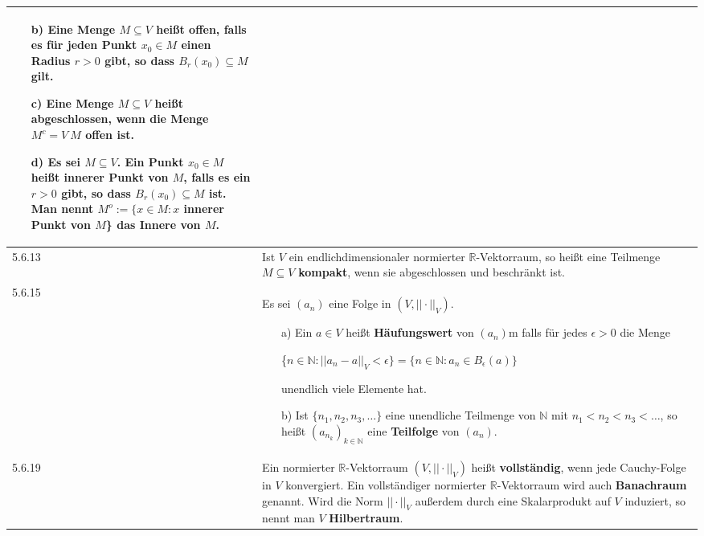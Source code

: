 \begin{table}[H]
\begin{tabularx}{\textwidth}{X m{16cm}}
\begin{itemize}
                \item[b)] Eine Menge $M \subseteq V$ heißt \textbf{offen}, falls es für jeden Punkt $x_0 \in M$ einen Radius
                            $r > 0$ gibt, so dass $B_r(x_0) \subseteq M$ gilt.
                \item[c)] Eine Menge $M \subseteq V$ heißt \textbf{abgeschlossen}, wenn die Menge $M^c = V \ M$ offen ist.
                \item[d)] Es sei $M \subseteq V$. Ein Punkt $x_0 \in M$ heißt \textbf{innerer Punkt} von $M$, falls es ein
                            $r > 0$ gibt, so dass $B_r(x_0) \subseteq M$ ist. \hfill \break 
                            Man nennt $M^o := \{x \in M: x$ innerer Punkt von $M$\} das \textbf{Innere von $M$}.    
                              
            \end{itemize} \\
    \midrule
    5.6.13& Ist $V$ ein endlichdimensionaler normierter $\mathbb{R}$-Vektorraum, so hei\ss t eine Teilmenge $M \subseteq V$
            \textbf{kompakt}, wenn sie abgeschlossen und beschränkt ist. \\
    \midrule
    5.6.15& Es sei $(a_n)$ eine Folge in $(V, ||\cdot||_V)$.
            \begin{itemize}
                \item[a)] Ein $a \in V$ hei\ss t \textbf{Häufungswert} von $(a_n)$m falls für jedes $\epsilon > 0$ die Menge \hfill \break
                            \centerline{\{$n \in \mathbb{N} : ||a_n - a||_V < \epsilon\} = \{n \in \mathbb{N}: a_n \in B_{\epsilon}(a)\}$}
                            unendlich viele Elemente hat.
                \item[b)] Ist $\{n_1,n_2,n_3,\dots\}$ eine unendliche Teilmenge von $\mathbb{N}$ mit $n_1 < n_2 < n_3 < \dots$, so
                            hei\ss t $(a_{n_k})_{k \in \mathbb{N}}$ eine \textbf{Teilfolge} von $(a_n)$. 
            \end{itemize} \\
    \midrule
    5.6.19& Ein normierter $\mathbb{R}$-Vektorraum $(V, ||\cdot||_V)$ heißt \textbf{vollständig}, wenn jede Cauchy-Folge in $V$ konvergiert.
            Ein vollständiger normierter $\mathbb{R}$-Vektorraum wird auch \textbf{Banachraum} genannt. \hfill \break
            Wird die Norm $||\cdot||_V$ außerdem durch eine Skalarprodukt auf $V$ induziert, so nennt man $V$ \textbf{Hilbertraum}. \\


    \bottomrule

\end{tabularx}
\end{table}

